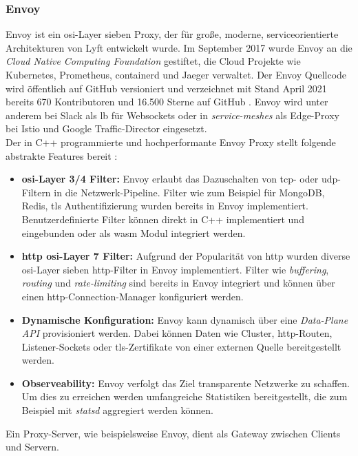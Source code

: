 \subsubsection{Envoy} \label{s:envoy}
Envoy ist ein \ac{osi}-Layer sieben Proxy, der für gro{\ss}e, moderne, serviceorientierte Architekturen von Lyft entwickelt wurde.
Im September 2017 wurde Envoy an die \textit{Cloud Native Computing Foundation} gestiftet, die Cloud Projekte wie Kubernetes, Prometheus, containerd und Jaeger verwaltet.
Der Envoy Quellcode wird öffentlich auf GitHub versioniert und verzeichnet mit Stand April 2021 bereits 670 Kontributoren und 16.500 Sterne auf GitHub \cite{EnvoyproxyEnvoy2021}.
Envoy wird unter anderem bei Slack \cite{MigratingMillionsConcurrent2021} als \acl{lb} für Websockets oder in \textit{service-meshes} als Edge-Proxy bei Istio \cite{Istio} und Google Traffic-Director \cite{TrafficDirectorGoogle} eingesetzt.
\\
Der in C++ programmierte und hochperformante Envoy Proxy stellt folgende abstrakte Features bereit \cite{WhatEnvoyEnvoy}:
\begin{itemize}
    \item \textbf{\acs{osi}-Layer 3/4 Filter:} Envoy erlaubt das Dazuschalten von \acs{tcp}- oder \acs{udp}-Filtern in die Netzwerk-Pipeline. Filter wie zum Beispiel für MongoDB, Redis, \ac{tls} Authentifizierung wurden bereits in Envoy implementiert. Benutzerdefinierte Filter können direkt in C++ implementiert und eingebunden oder als \ac{wasm} Modul integriert werden.
    \item \textbf{\acs{http} \ac{osi}-Layer 7 Filter:} Aufgrund der Popularität von \ac{http} wurden diverse \ac{osi}-Layer sieben \ac{http}-Filter in Envoy implementiert. Filter wie \textit{buffering}, \textit{routing} und \textit{rate-limiting} sind bereits in Envoy integriert und können über einen \ac{http}-Connection-Manager konfiguriert werden.
    \item \textbf{Dynamische Konfiguration:} Envoy kann dynamisch über eine \textit{Data-Plane API} provisioniert werden. Dabei können Daten wie Cluster, \ac{http}-Routen, Listener-Sockets oder \ac{tls}-Zertifikate von einer externen Quelle bereitgestellt werden.
    \item \textbf{Observeability:} Envoy verfolgt das Ziel transparente Netzwerke zu schaffen. Um dies zu erreichen werden umfangreiche Statistiken bereitgestellt, die zum Beispiel mit \textit{statsd} aggregiert werden können.
\end{itemize}
Ein Proxy-Server, wie beispielsweise Envoy, dient als Gateway zwischen Clients und Servern.
